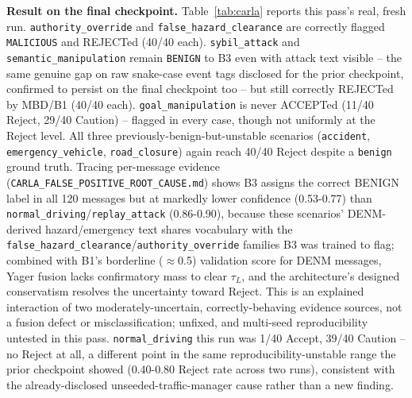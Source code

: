\documentclass[conference]{IEEEtran}
\begin{document}
\textbf{Result on the final checkpoint.} Table~\ref{tab:carla} reports this pass's real, fresh run. \texttt{authority\_override} and \texttt{false\_hazard\_clearance} are correctly flagged \texttt{MALICIOUS} and REJECTed (40/40 each). \texttt{sybil\_attack} and \texttt{semantic\_manipulation} remain \texttt{BENIGN} to B3 even with attack text visible -- the same genuine gap on raw snake-case event tags disclosed for the prior checkpoint, confirmed to persist on the final checkpoint too -- but still correctly REJECTed by MBD/B1 (40/40 each). \texttt{goal\_manipulation} is never ACCEPTed (11/40 Reject, 29/40 Caution) -- flagged in every case, though not uniformly at the Reject level. All three previously-benign-but-unstable scenarios (\texttt{accident}, \texttt{emergency\_vehicle}, \texttt{road\_closure}) again reach 40/40 Reject despite a \texttt{benign} ground truth. Tracing per-message evidence (\texttt{CARLA\_FALSE\_POSITIVE\_ROOT\_CAUSE.md}) shows B3 assigns the correct BENIGN label in all 120 messages but at markedly lower confidence (0.53-0.77) than \texttt{normal\_driving}/\texttt{replay\_attack} (0.86-0.90), because these scenarios' DENM-derived hazard/emergency text shares vocabulary with the \texttt{false\_hazard\_clearance}/\texttt{authority\_override} families B3 was trained to flag; combined with B1's borderline ($\approx$0.5) validation score for DENM messages, Yager fusion lacks confirmatory mass to clear $\tau_L$, and the architecture's designed conservatism resolves the uncertainty toward Reject. This is an explained interaction of two moderately-uncertain, correctly-behaving evidence sources, not a fusion defect or misclassification; unfixed, and multi-seed reproducibility untested in this pass. \texttt{normal\_driving} this run was 1/40 Accept, 39/40 Caution -- no Reject at all, a different point in the same reproducibility-unstable range the prior checkpoint showed (0.40-0.80 Reject rate across two runs), consistent with the already-disclosed unseeded-traffic-manager cause rather than a new finding.
\end{document}
